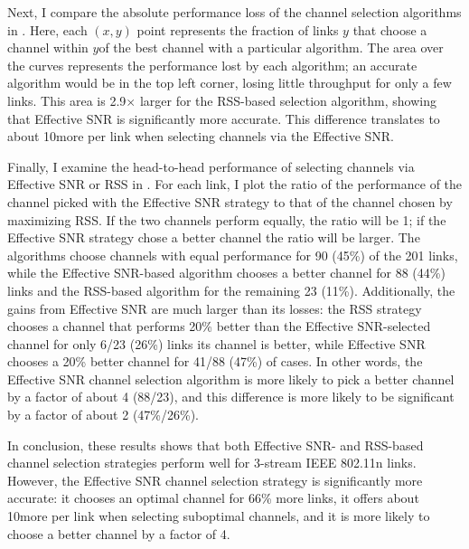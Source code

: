 Next, I compare the absolute performance loss of the channel selection algorithms in . Here, each $(x,y)$ point represents the fraction of links $y$ that choose a channel within $y$\Mbps of the best channel with a particular algorithm. The area over the curves represents the performance lost by each algorithm; an accurate algorithm would be in the top left corner, losing little throughput for only a few links. This area is 2.9$\times$ larger for the RSS-based selection algorithm, showing that Effective SNR is significantly more accurate. This difference translates to about 10\Mbps more per link when selecting channels via the Effective SNR\@.

Finally, I examine the head-to-head performance of selecting channels via Effective SNR or RSS in . For each link, I plot the ratio of the performance of the channel picked with the Effective SNR strategy to that of the channel chosen by maximizing RSS\@. If the two channels perform equally, the ratio will be 1; if the Effective SNR strategy chose a better channel the ratio will be larger. The algorithms choose channels with equal performance for 90 (45\%) of the 201 links, while the Effective SNR-based algorithm chooses a better channel for 88 (44\%) links and the RSS-based algorithm for the remaining 23 (11\%). Additionally, the gains from Effective SNR are much larger than its losses: the RSS strategy chooses a channel that performs 20\% better than the Effective SNR-selected channel for only 6/23 (26\%) links its channel is better, while Effective SNR chooses a 20\% better channel for 41/88 (47\%) of cases. In other words, the Effective SNR channel selection algorithm is more likely to pick a better channel by a factor of about 4 (88/23), and this difference is more likely to be significant by a factor of about 2 (47\%/26\%).

In conclusion, these results shows that both Effective SNR- and RSS-based channel selection strategies perform well for 3-stream IEEE 802.11n links. However, the Effective SNR channel selection strategy is significantly more accurate: it chooses an optimal channel for 66\% more links, it offers about 10\Mbps more per link when selecting suboptimal channels, and it is more likely to choose a better channel by a factor of 4.

